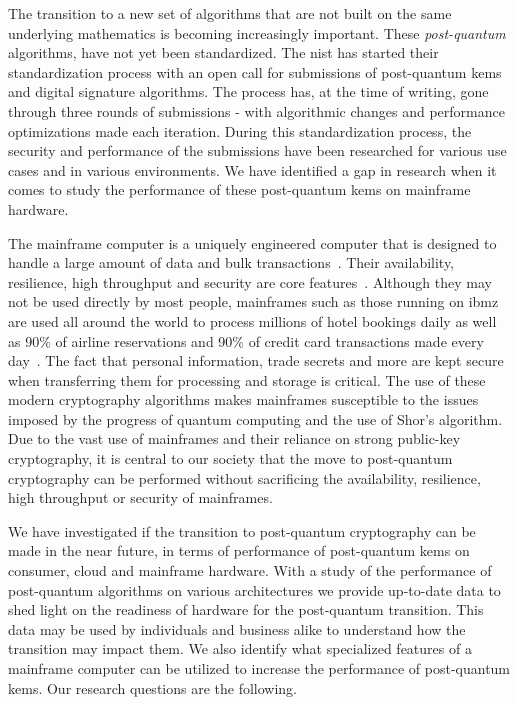 The transition to a new set of algorithms that are not built on the same underlying mathematics is becoming increasingly important. These \textit{\gls{post-quantum}} algorithms, have not yet been standardized. The \acrfull{nist} has started their standardization process with an open call for submissions of \gls{post-quantum} \glspl{kem} and digital signature algorithms. The process has, at the time of writing, gone through three rounds of submissions - with algorithmic changes and performance optimizations made each iteration. During this standardization process, the security and performance of the submissions have been researched for various use cases and in various environments. We have identified a gap in research when it comes to study the performance of these \gls{post-quantum} \glspl{kem} on mainframe hardware.

The mainframe computer is a uniquely engineered computer that is designed to handle a large amount of data and bulk transactions~\cite{mainframes}. Their availability, resilience, high throughput and security are core features~\cite{mainframes}. Although they may not be used directly by most people, mainframes such as those running on \gls{ibmz} are used all around the world to process millions of hotel bookings daily as well as 90\% of airline reservations and 90\% of credit card transactions made every day~\cite{jacobi2020}. The fact that personal information, trade secrets and more are kept secure when transferring them for processing and storage is critical. The use of these modern cryptography algorithms makes mainframes susceptible to the issues imposed by the progress of quantum computing and the use of Shor's algorithm. Due to the vast use of mainframes and their reliance on strong public-key cryptography, it is central to our society that the move to \gls{post-quantum} cryptography can be performed without sacrificing the availability, resilience, high throughput or security of mainframes.

We have investigated if the transition to \gls{post-quantum} cryptography can be made in the near future, in terms of performance of \gls{post-quantum} \glspl{kem} on consumer, cloud and mainframe hardware. With a study of the performance of \gls{post-quantum} algorithms on various architectures we provide up-to-date data to shed light on the readiness of hardware for the \gls{post-quantum} transition. This data may be used by individuals and business alike to understand how the transition may impact them. We also identify what specialized features of a mainframe computer can be utilized to increase the performance of \gls{post-quantum} \glspl{kem}. Our research questions are the following.

